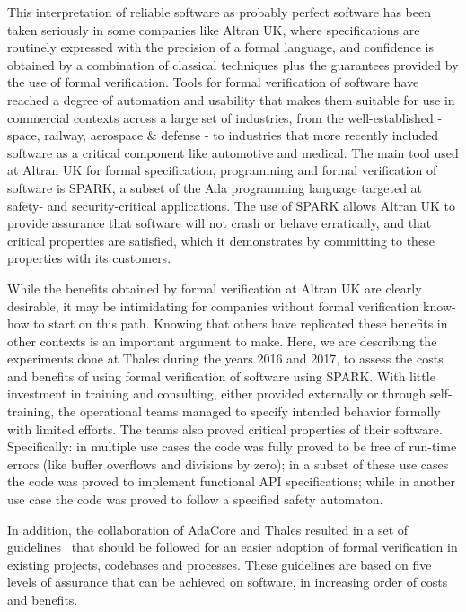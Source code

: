 \documentclass{llncs}
\begin{document}
This interpretation of reliable software as probably perfect software has been
taken seriously in some companies like Altran UK, where specifications are
routinely expressed with the precision of a formal language, and confidence is
obtained by a combination of classical techniques plus the guarantees provided
by the use of formal verification. Tools for formal verification of software
have reached a degree of automation and usability that makes them suitable for
use in commercial contexts across a large set of industries, from the
well-established - space, railway, aerospace \& defense - to industries that
more recently included software as a critical component like automotive and
medical. The main tool used at Altran UK for formal specification, programming
and formal verification of software is SPARK, a subset of the Ada programming
language targeted at safety- and security-critical applications. The use of
SPARK allows Altran UK to provide assurance that software will not crash or
behave erratically, and that critical properties are satisfied, which it
demonstrates by committing to these properties with its customers.

While the benefits obtained by formal verification at Altran UK are clearly
desirable, it may be intimidating for companies without formal verification
know-how to start on this path. Knowing that others have replicated these
benefits in other contexts is an important argument to make.  Here, we are
describing the experiments done at Thales during the years 2016 and 2017, to
assess the costs and benefits of using formal verification of software using
SPARK. With little investment in training and consulting, either provided
externally or through self-training, the operational teams managed to specify
intended behavior formally with limited efforts. The teams also proved critical
properties of their software. Specifically: in multiple use cases the code was
fully proved to be free of run-time errors (like buffer overflows and divisions
by zero); in a subset of these use cases the code was proved to implement
functional API specifications; while in another use case the code was proved to
follow a specified safety automaton.

In addition, the collaboration of AdaCore and Thales resulted in a set of
guidelines~\cite{AdaCoreThalesSPARK} that should be followed for an easier
adoption of formal verification in existing projects, codebases and
processes. These guidelines are based on five levels of assurance that can be
achieved on software, in increasing order of costs and benefits.
\end{document}
